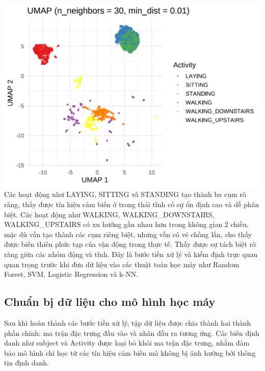 \documentclass[
]{article}
\begin{document}
\includegraphics{report_files/figure-latex/unnamed-chunk-22-1.pdf} Các
hoạt động như LAYING, SITTING và STANDING tạo thành ba cụm rõ ràng, thấy
được tín hiệu cảm biến ở trong thái tĩnh có sự ổn định cao và dễ phân
biệt. Các hoạt động như WALKING, WALKING\_DOWNSTAIRS, WALKING\_UPSTAIRS
có xu hướng gần nhau hơn trong không gian 2 chiều, mặc dù vẫn tạo thành
các cụm riêng biệt, nhưng vẫn có vẻ chồng lấn, cho thấy được biến thiên
phức tạp của vận động trong thực tế. Thấy được sự tách biệt rõ ràng giữa
các nhóm động và tĩnh. Đây là bước tiền xử lý và kiểm định trực quan
quan trọng trước khi đưa dữ liệu vào các thuật toán học máy như Random
Forest, SVM, Logistic Regression và k-NN.

\subsection{Chuẩn bị dữ liệu cho mô hình học
máy}\label{chuux1ea9n-bux1ecb-dux1eef-liux1ec7u-cho-muxf4-huxecnh-hux1ecdc-muxe1y}

Sau khi hoàn thành các bước tiền xử lý, tập dữ liệu được chia thành hai
thành phần chính: ma trận đặc trưng đầu vào và nhãn đầu ra tương ứng.
Các biến định danh như subject và Activity được loại bỏ khỏi ma trận đặc
trưng, nhằm đảm bảo mô hình chỉ học từ các tín hiệu cảm biến mà không bị
ảnh hưởng bởi thông tin định danh.
\end{document}
